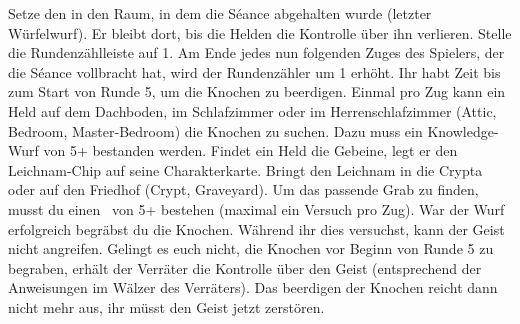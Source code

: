     \begin{itemize}
        \bitem Setze den  in den Raum, in dem die Séance abgehalten wurde (letzter Würfelwurf). Er bleibt dort, bis die Helden die Kontrolle über ihn verlieren.
        \bitem Stelle die Rundenzählleiste auf 1. Am Ende jedes nun folgenden Zuges des Spielers, der die Séance vollbracht hat, wird der Rundenzähler um 1 erhöht. Ihr habt Zeit bis zum Start von Runde 5, um die Knochen zu beerdigen.
        \bitem Einmal pro Zug kann ein Held auf dem Dachboden, im Schlafzimmer oder im Herrenschlafzimmer (Attic, Bedroom, Master-Bedroom) die Knochen zu suchen. Dazu muss ein Knowledge-Wurf von 5+ bestanden werden. Findet ein Held die Gebeine, legt er den Leichnam-Chip auf seine Charakterkarte.
        \bitem Bringt den Leichnam in die Crypta oder auf den Friedhof (Crypt, Graveyard). Um das passende Grab zu finden, musst du einen \knowroll\ von 5+ bestehen (maximal ein Versuch pro Zug). War der Wurf erfolgreich begräbst du die Knochen.
        \bitem Während ihr dies versuchst, kann der Geist nicht angreifen. Gelingt es euch nicht, die Knochen vor Beginn von Runde 5 zu begraben, erhält der Verräter die Kontrolle über den Geist (entsprechend der Anweisungen im Wälzer des Verräters). Das beerdigen der Knochen reicht dann nicht mehr aus, ihr müsst den Geist jetzt zerstören.
    \end{itemize}


